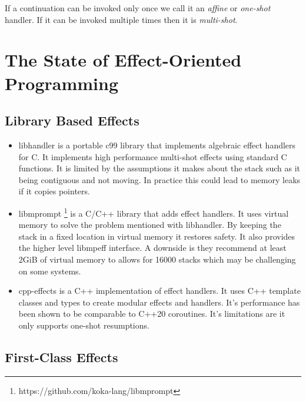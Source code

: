 \documentclass[logo,bsc,singlespacing,parskip]{infthesis}
\begin{document}
If a continuation can be invoked only once we call it an \emph{affine} or
\emph{one-shot} handler.  If it can be invoked multiple times then it is
\emph{multi-shot}.

\section{The State of Effect-Oriented Programming}

\subsection{Library Based Effects}

\begin{itemize}
        \item{libhandler \cite{leijen2017implementing} is a portable c99 library
that implements algebraic effect handlers for C. It implements high performance
multi-shot effects using standard C functions. It is limited by the assumptions
it makes about the stack such as it being contiguous and not moving. In practice
this could lead to memory leaks if it copies pointers.}
        \item{libmprompt \footnote{https://github.com/koka-lang/libmprompt} is a
C/C++ library that adds effect handlers. It uses virtual memory to solve the
problem mentioned with libhandler. By keeping the stack in a fixed location in
virtual memory it restores safety. It also provides the higher level libmpeff
interface. A downside is they recommend at least 2GiB of virtual memory to
allows for 16000 stacks which may be challenging on some systems.}
        \item{cpp-effects \cite{DBLP:journals/pacmpl/GhicaLBP22} is a C++
implementation of effect handlers. It uses C++ template classes and types to
create modular effects and handlers. It's performance has been shown to be
comparable to C++20 coroutines. It's limitations are it only supports one-shot
resumptions.}
\end{itemize}

\subsection{First-Class Effects}
\end{document}
